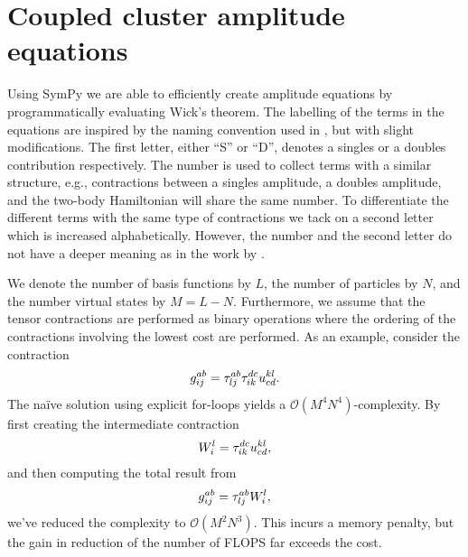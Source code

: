     \section{Coupled cluster amplitude equations}
        Using SymPy \cite{sympy} we are able to efficiently create amplitude
        equations by programmatically evaluating Wick's theorem.
        The labelling of the terms in the equations are inspired by the naming
        convention used in  \cite{shavitt2009many},
        but with slight modifications.
        The first letter, either ``S'' or ``D'', denotes a singles or a doubles
        contribution respectively.
        The number is used to collect terms with a similar structure, e.g.,
        contractions between a singles amplitude, a doubles amplitude, and the
        two-body Hamiltonian will share the same number.
        To differentiate the different terms with the same type of contractions
        we tack on a second letter which is increased alphabetically.
        However, the number and the second letter do not have a deeper meaning
        as in the work by \citeauthor{shavitt2009many} \cite{shavitt2009many}.

        We denote the number of basis functions by $L$, the number of particles
        by $N$, and the number virtual states by $M = L - N$.
        Furthermore, we assume that the tensor contractions are performed as
        binary operations where the ordering of the contractions involving the
        lowest cost are performed.
        As an example, consider the contraction
        \begin{align}
            g^{ab}_{ij} = \tau^{ab}_{lj} \tau^{dc}_{ik}
            u^{kl}_{cd}.
        \end{align}
        The naïve solution using explicit for-loops yields a $\mathcal{O}(M^4
        N^4)$-complexity.
        By first creating the intermediate contraction
        \begin{align}
            W^{l}_{i} = \tau^{dc}_{ik} u^{kl}_{cd},
        \end{align}
        and then computing the total result from
        \begin{align}
            g^{ab}_{ij} = \tau^{ab}_{lj} W^{l}_{i},
        \end{align}
        we've reduced the complexity to $\mathcal{O}(M^2 N^3)$.
        This incurs a memory penalty, but the gain in reduction of the number of
        FLOPS far exceeds the cost.

